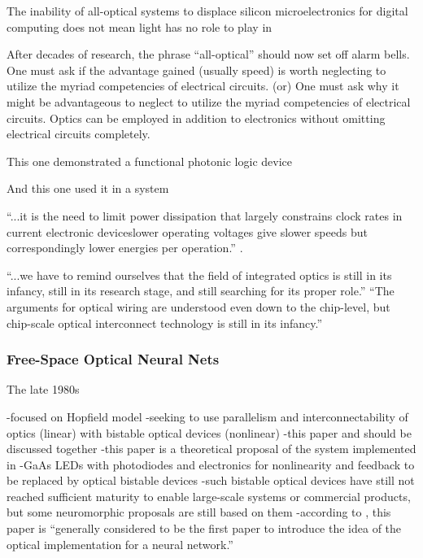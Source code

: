 The inability of all-optical systems to displace silicon microelectronics for digital computing does not mean light has no role to play in 

\vspace{3em}
After decades of research, the phrase ``all-optical'' should now set off alarm bells. One must ask if the advantage gained (usually speed) is worth neglecting to utilize the myriad competencies of electrical circuits. (or) One must ask why it might be advantageous to neglect to utilize the myriad competencies of electrical circuits. Optics can be employed in addition to electronics without omitting electrical circuits completely.

\vspace{3em}
This one demonstrated a functional photonic logic device
\cite{lehi1989}

And this one used it in a system
\cite{mccl1993}


\vspace{3em}
``...it is the need to limit power dissipation that largely constrains clock rates in current electronic devices\textemdash lower operating voltages give slower speeds but correspondingly lower energies per operation.'' \cite{mi2010}.

\vspace{3em}
``...we have to remind ourselves that the field of integrated optics is still in its infancy, still in its research stage, and still searching for its proper role.'' \cite{ko1981}
``The arguments for optical wiring are understood even down to the chip-level, but chip-scale optical interconnect technology is still in its infancy.'' \cite{mi2010}

\subsubsection{Free-Space Optical Neural Nets}
The late 1980s 

\cite{psfa1985}
-focused on Hopfield model 
-seeking to use parallelism and interconnectability of optics (linear) with bistable optical devices (nonlinear)
-this paper and \cite{faps1985} should be discussed together
-this paper is a theoretical proposal of the system implemented in \cite{faps1985}
-GaAs LEDs with photodiodes and electronics for nonlinearity and feedback to be replaced by optical bistable devices
-such bistable optical devices have still not reached sufficient maturity to enable large-scale systems or commercial products, but some neuromorphic proposals are still based on them
-according to \cite{juyu1996}, this paper is ``generally considered to be the first paper to introduce the idea of the optical implementation for a neural network.'' \cite{juyu1996}

